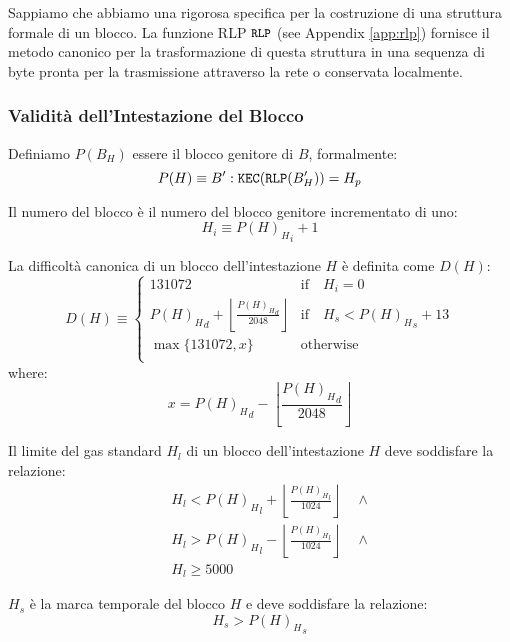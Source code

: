 \documentclass[9pt,oneside]{amsart}
\begin{document}
\begin{multicols}{2}
Sappiamo che abbiamo una rigorosa specifica per la costruzione di una struttura formale di un blocco. La funzione RLP $\texttt{\small RLP}$ (see Appendix \ref{app:rlp}) fornisce il metodo canonico per la trasformazione di questa struttura in una sequenza di byte pronta per la trasmissione attraverso la rete o conservata localmente.

\subsubsection{Validità dell'Intestazione del Blocco}

Definiamo $P(B_H)$ essere il blocco genitore di $B$, formalmente:
\begin{equation}
P(H) \equiv B': \mathtt{\tiny KEC}(\mathtt{\tiny RLP}(B'_H)) = H_p
\end{equation}

Il numero del blocco è il numero del blocco genitore incrementato di uno:
\begin{equation}
H_i \equiv {{P(H)_H}_i} + 1
\end{equation}

La difficoltà canonica di un blocco dell'intestazione $H$ è definita come $D(H)$:
\begin{equation}
D(H) \equiv \begin{cases}
131072 & \text{if} \quad H_i = 0\\
{P(H)_H}_d + \left\lfloor\frac{{P(H)_H}_d}{2048}\right\rfloor & \text{if} \quad H_s < {P(H)_H}_s + 13\\
\max \{ 131072, x \} & \text{otherwise}\\
\end{cases}
\end{equation}
where:
\begin{equation}
x = {P(H)_H}_d - \left\lfloor\frac{{P(H)_H}_d}{2048}\right\rfloor
\end{equation}

Il limite del gas standard $H_l$ di un blocco dell'intestazione $H$ deve soddisfare la relazione:
\begin{eqnarray}
& & H_l < {P(H)_H}_l + \left\lfloor\frac{{P(H)_H}_l}{1024}\right\rfloor \quad \wedge \\
& & H_l > {P(H)_H}_l - \left\lfloor\frac{{P(H)_H}_l}{1024}\right\rfloor \quad \wedge \\
& & H_l \geqslant 5000
\end{eqnarray}

$H_s$ è la marca temporale del blocco $H$ e deve soddisfare la relazione:
\begin{equation}
H_s > {P(H)_H}_s
\end{equation}


\end{multicols}
\end{document}
